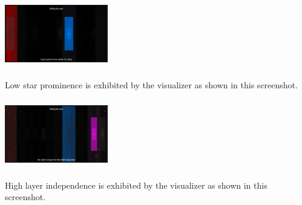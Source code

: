 \documentclass{sigchi-ext}
\begin{document}
\begin{marginfigure}[0pc]
\begin{minipage}{\marginparwidth}
     \includegraphics[width=4.5cm,height=3cm]{figures/LowStarVsisibility.png}
    \caption{Low star prominence is exhibited by the visualizer as shown in this screenshot.}
    \label{fig:lowstar}
    \end{minipage}
\end{marginfigure}

\begin{marginfigure}[0pc]
\begin{minipage}{\marginparwidth}
     \includegraphics[width=4.5cm,height=3cm]{figures/HighLayerIndependence.png}
    \caption{High layer independence is exhibited by the visualizer as shown in this screenshot.}
    \label{fig:highindependence}
    \end{minipage}
\end{marginfigure}
\end{document}
